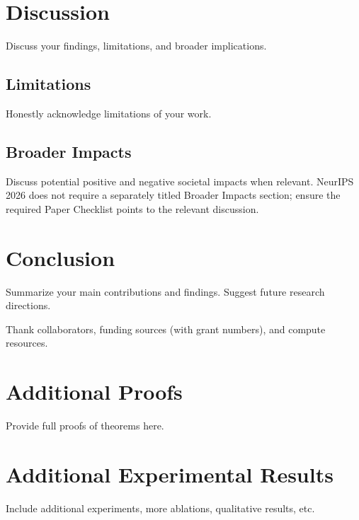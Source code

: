 \documentclass{article}
\begin{document}
\section{Discussion}
\label{sec:discussion}

Discuss your findings, limitations, and broader implications.

\subsection{Limitations}
Honestly acknowledge limitations of your work.

\subsection{Broader Impacts}
Discuss potential positive and negative societal impacts when relevant. NeurIPS 2026
does not require a separately titled Broader Impacts section; ensure the required
Paper Checklist points to the relevant discussion.

\section{Conclusion}
\label{sec:conclusion}

Summarize your main contributions and findings. Suggest future research directions.

\begin{ack}
Thank collaborators, funding sources (with grant numbers), and compute resources.
\end{ack}


\appendix

\section{Additional Proofs}
\label{app:proofs}

Provide full proofs of theorems here.

\section{Additional Experimental Results}
\label{app:experiments}

Include additional experiments, more ablations, qualitative results, etc.
\end{document}
